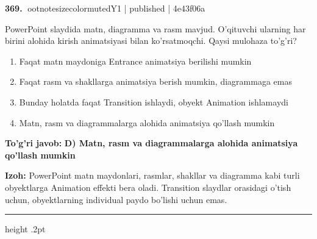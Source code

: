 \documentclass[10pt,a4paper]{article}
\begin{document}
\textbf{\color{ink}369.} {ootnotesizecolor{muted}Y1 | published | 4e43f06a}
\par
PowerPoint slaydida matn, diagramma va rasm mavjud. O'qituvchi ularning har birini alohida kirish animatsiyasi bilan ko'rsatmoqchi. Qaysi mulohaza to'g'ri?
\begin{enumerate}[label=\Alph*),leftmargin=9mm]
\item Faqat matn maydoniga Entrance animatsiya berilishi mumkin
\item Faqat rasm va shakllarga animatsiya berish mumkin, diagrammaga emas
\item Bunday holatda faqat Transition ishlaydi, obyekt Animation ishlamaydi
\item Matn, rasm va diagrammalarga alohida animatsiya qo'llash mumkin
\end{enumerate}
\begin{tcolorbox}[enhanced,breakable,colback=teal!4,colframe=teal!55!black,boxrule=0.45pt,arc=1.2mm,left=2.8mm,right=2.8mm,top=2mm,bottom=2mm]
\textbf{\color{teal}To'g'ri javob:} \textbf{D) Matn, rasm va diagrammalarga alohida animatsiya qo'llash mumkin}
\par\smallskip
\textbf{Izoh:} PowerPoint matn maydonlari, rasmlar, shakllar va diagramma kabi turli obyektlarga Animation effekti bera oladi. Transition slaydlar orasidagi o'tish uchun, obyektlarning individual paydo bo'lishi uchun emas.
\end{tcolorbox}
\vspace{2mm}\hrule height .2pt\vspace{2mm}
\end{document}
